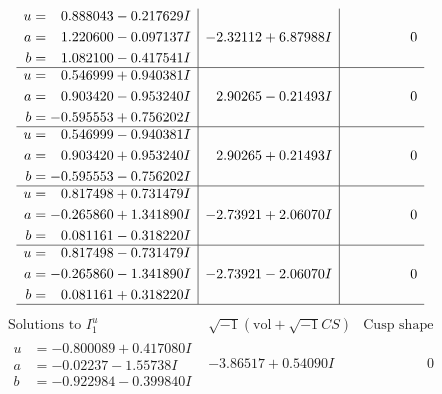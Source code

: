 \documentclass[1p]{elsarticle_modified}
\theoremstyle{definition}
\newcommand{\I}{\sqrt{-1}}
\begin{document}
$$\begin{array}{c|c|c}
\begin{aligned}
u &= \phantom{-}0.888043 - 0.217629 I \\
a &= \phantom{-}1.220600 - 0.097137 I \\
b &= \phantom{-}1.082100 - 0.417541 I\end{aligned}
 & -2.32112 + 6.87988 I & \phantom{-0.000000 } 0 \\ \hline\begin{aligned}
u &= \phantom{-}0.546999 + 0.940381 I \\
a &= \phantom{-}0.903420 - 0.953240 I \\
b &= -0.595553 + 0.756202 I\end{aligned}
 & \phantom{-}2.90265 - 0.21493 I & \phantom{-0.000000 } 0 \\ \hline\begin{aligned}
u &= \phantom{-}0.546999 - 0.940381 I \\
a &= \phantom{-}0.903420 + 0.953240 I \\
b &= -0.595553 - 0.756202 I\end{aligned}
 & \phantom{-}2.90265 + 0.21493 I & \phantom{-0.000000 } 0 \\ \hline\begin{aligned}
u &= \phantom{-}0.817498 + 0.731479 I \\
a &= -0.265860 + 1.341890 I \\
b &= \phantom{-}0.081161 - 0.318220 I\end{aligned}
 & -2.73921 + 2.06070 I & \phantom{-0.000000 } 0 \\ \hline\begin{aligned}
u &= \phantom{-}0.817498 - 0.731479 I \\
a &= -0.265860 - 1.341890 I \\
b &= \phantom{-}0.081161 + 0.318220 I\end{aligned}
 & -2.73921 - 2.06070 I & \phantom{-0.000000 } 0\\
 \hline 
 \end{array}$$\newpage$$\begin{array}{c|c|c}  
\text{Solutions to }I^u_{1}& \I (\text{vol} + \sqrt{-1}CS) & \text{Cusp shape}\\
 \hline 
\begin{aligned}
u &= -0.800089 + 0.417080 I \\
a &= -0.02237 - 1.55738 I \\
b &= -0.922984 - 0.399840 I\end{aligned}
 & -3.86517 + 0.54090 I & \phantom{-0.000000 } 0 \\ \hline\begin{aligned}

\end{aligned}
\end{array}$$
\end{document}
